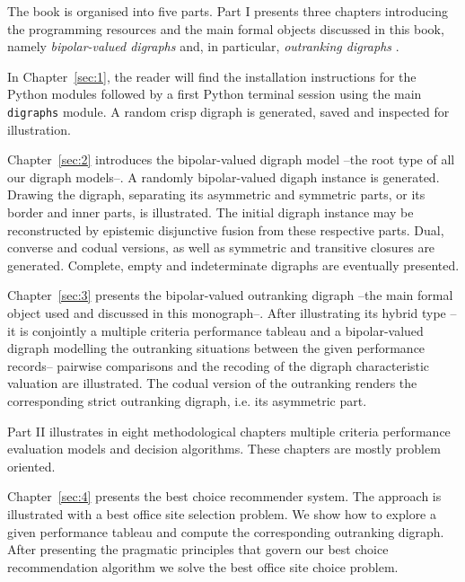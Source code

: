{}
\label{sec:0.2}

The book is organised into five parts. Part I presents three chapters introducing the \Digraph programming resources and the main formal objects discussed in this book, namely \emph{bipolar-valued digraphs} and, in particular, \emph{outranking digraphs} \citep{BIS-2021}.

In Chapter~\vref{sec:1}, the reader will find the installation instructions for the \Digraph Python modules followed by a first Python terminal session using the main \texttt{digraphs} module. A random crisp digraph is generated, saved and inspected for illustration.

Chapter~\vref{sec:2} introduces the bipolar-valued digraph model --the root type of all our digraph models--. A randomly bipolar-valued digaph instance is generated. Drawing the digraph, separating its asymmetric and symmetric parts, or its border and inner parts, is illustrated. The initial digraph instance may be reconstructed by epistemic disjunctive fusion from these respective parts. Dual, converse and codual versions, as well as symmetric and transitive closures are generated. Complete, empty and indeterminate digraphs are eventually presented.

Chapter~\vref{sec:3} presents the bipolar-valued outranking digraph --the main formal object used and discussed in this monograph--. After illustrating its hybrid type --it is conjointly a multiple criteria performance tableau and a bipolar-valued digraph modelling the outranking situations between the given performance records-- pairwise comparisons and the recoding of the digraph characteristic valuation are illustrated. The codual version of the outranking renders the corresponding strict outranking digraph, i.e. its asymmetric part. 

Part II illustrates in eight methodological chapters multiple criteria performance evaluation models and decision algorithms. These chapters are mostly problem oriented.

Chapter~\vref{sec:4} presents the \Rubis best choice recommender system. The approach is illustrated with a best office site selection problem. We show how to explore a given performance tableau and compute the corresponding outranking digraph. After presenting the pragmatic principles that govern our best choice recommendation algorithm we solve the best office site choice problem.

